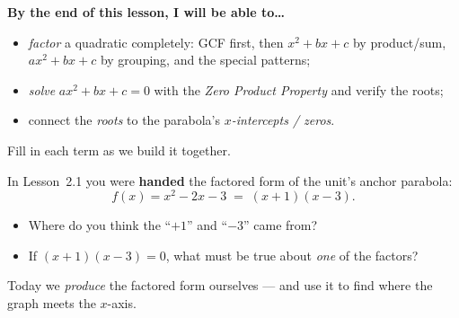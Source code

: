 \documentclass[10pt]{article}
\begin{document}

\vspace{0.10in}

\begin{objectivebox}
\textbf{By the end of this lesson, I will be able to\dots}
\begin{itemize}\setlength{\itemsep}{2pt}
  \item \emph{factor} a quadratic completely: GCF first, then $x^2+bx+c$ by product/sum, $ax^2+bx+c$ by grouping, and the special patterns;
  \item \emph{solve} $ax^2+bx+c=0$ with the \emph{Zero Product Property} and verify the roots;
  \item connect the \emph{roots} to the parabola's \emph{$x$-intercepts / zeros}.
\end{itemize}
\end{objectivebox}

\vspace{0.06in}

\begin{vocabbox}
\small
Fill in each term as we build it together.
\par\vspace{2pt}
\end{vocabbox}

\begin{hookbox}
In Lesson~2.1 you were \textbf{handed} the factored form of the unit's anchor parabola:
\[ f(x)=x^2-2x-3 \;=\; (x+1)(x-3). \]
\begin{itemize}\setlength{\itemsep}{1pt}
  \item Where do you think the ``$+1$'' and ``$-3$'' came from? \writeline
  \item If $(x+1)(x-3)=0$, what must be true about \emph{one} of the factors? \writeline
\end{itemize}
Today we \emph{produce} the factored form ourselves --- and use it to find where the graph meets the $x$-axis.
\end{hookbox}
\end{document}
